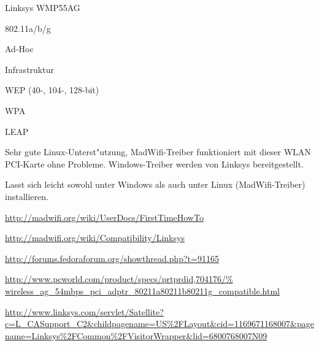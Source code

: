 %
%
\begin{wlandevice}{Linksys WMP55AG}



\begin{wlanieeestandard}
\item 802.11a/b/g
\end{wlanieeestandard}

\begin{wlanmode}
\item Ad-Hoc
\item Infrastruktur
\end{wlanmode}

\begin{wlansecurity}
\item WEP (40-, 104-, 128-bit)
\item WPA
\item LEAP
\end{wlansecurity}

\begin{wlandriver}
\item
Sehr gute Linux-Unterst"utzung, MadWifi-Treiber funktioniert
mit dieser WLAN PCI-Karte ohne Probleme.
Windows-Treiber werden von Linksys bereitgestellt.
\end{wlandriver}


\begin{wlaninstall}
\item
Lasst sich leicht sowohl unter Windows als auch unter Linux (MadWifi-Treiber)
installieren.

\url{http://madwifi.org/wiki/UserDocs/FirstTimeHowTo}
\end{wlaninstall}

\begin{wlanlink}
\item \url{http://madwifi.org/wiki/Compatibility/Linksys}
\item \url{http://forums.fedoraforum.org/showthread.php?t=91165}
\item \url{http://www.pcworld.com/product/specs/prtprdid,704176/%
	wireless_ag_54mbps_pci_adptr_80211a80211b80211g_compatible.html}
\item \url{http://www.linksys.com/servlet/Satellite?c=L_CASupport_C2&childpagename=US\%2FLayout&cid=1169671168007&pagename=Linksys\%2FCommon\%2FVisitorWrapper&lid=6800768007N09}
\end{wlanlink}

\end{wlandevice}

